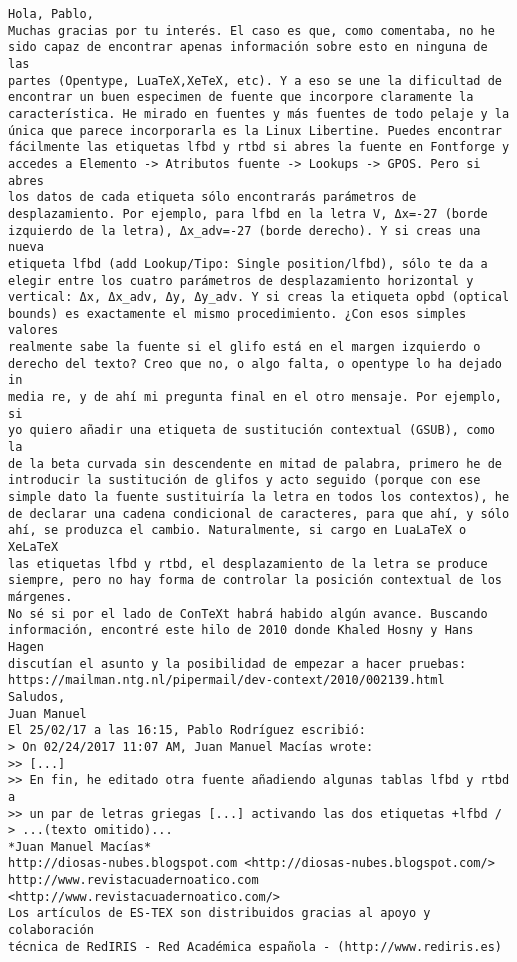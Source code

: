 \documentclass[a4paper,10pt]{article}
\begin{document}
\begin{lstlisting}
Hola, Pablo,
Muchas gracias por tu interés. El caso es que, como comentaba, no he 
sido capaz de encontrar apenas información sobre esto en ninguna de las 
partes (Opentype, LuaTeX,XeTeX, etc). Y a eso se une la dificultad de 
encontrar un buen especimen de fuente que incorpore claramente la 
característica. He mirado en fuentes y más fuentes de todo pelaje y la 
única que parece incorporarla es la Linux Libertine. Puedes encontrar 
fácilmente las etiquetas lfbd y rtbd si abres la fuente en Fontforge y 
accedes a Elemento -> Atributos fuente -> Lookups -> GPOS. Pero si abres 
los datos de cada etiqueta sólo encontrarás parámetros de 
desplazamiento. Por ejemplo, para lfbd en la letra V, Δx=-27 (borde 
izquierdo de la letra), Δx_adv=-27 (borde derecho). Y si creas una nueva 
etiqueta lfbd (add Lookup/Tipo: Single position/lfbd), sólo te da a 
elegir entre los cuatro parámetros de desplazamiento horizontal y 
vertical: Δx, Δx_adv, Δy, Δy_adv. Y si creas la etiqueta opbd (optical 
bounds) es exactamente el mismo procedimiento. ¿Con esos simples valores 
realmente sabe la fuente si el glifo está en el margen izquierdo o 
derecho del texto? Creo que no, o algo falta, o opentype lo ha dejado in 
media re, y de ahí mi pregunta final en el otro mensaje. Por ejemplo, si 
yo quiero añadir una etiqueta de sustitución contextual (GSUB), como la 
de la beta curvada sin descendente en mitad de palabra, primero he de 
introducir la sustitución de glifos y acto seguido (porque con ese 
simple dato la fuente sustituiría la letra en todos los contextos), he 
de declarar una cadena condicional de caracteres, para que ahí, y sólo 
ahí, se produzca el cambio. Naturalmente, si cargo en LuaLaTeX o XeLaTeX 
las etiquetas lfbd y rtbd, el desplazamiento de la letra se produce 
siempre, pero no hay forma de controlar la posición contextual de los 
márgenes.
No sé si por el lado de ConTeXt habrá habido algún avance. Buscando 
información, encontré este hilo de 2010 donde Khaled Hosny y Hans Hagen 
discutían el asunto y la posibilidad de empezar a hacer pruebas: 
https://mailman.ntg.nl/pipermail/dev-context/2010/002139.html
Saludos,
Juan Manuel
El 25/02/17 a las 16:15, Pablo Rodríguez escribió:
> On 02/24/2017 11:07 AM, Juan Manuel Macías wrote:
>> [...]
>> En fin, he editado otra fuente añadiendo algunas tablas lfbd y rtbd a
>> un par de letras griegas [...] activando las dos etiquetas +lfbd /
> ...(texto omitido)...
*Juan Manuel Macías*
http://diosas-nubes.blogspot.com <http://diosas-nubes.blogspot.com/>
http://www.revistacuadernoatico.com <http://www.revistacuadernoatico.com/>
Los artículos de ES-TEX son distribuidos gracias al apoyo y colaboración 
técnica de RedIRIS - Red Académica española - (http://www.rediris.es)

\end{lstlisting}
\end{document}
